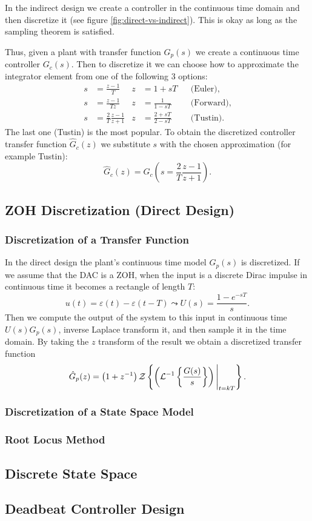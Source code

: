 In the indirect design we create a controller in the continuous time domain and then discretize it (see figure \ref{fig:direct-vs-indirect}). This is okay as long as the sampling theorem is satisfied.

Thus, given a plant with transfer function \(G_p(s)\) we create a continuous time controller \(G_c(s)\). Then to discretize it we can choose how to approximate the integrator element from one of the following 3 options:
\begin{align*}
	s & = \frac{z - 1}{T}                & z & = 1 + sT                && \text{(Euler)},   \\
	s & = \frac{z - 1}{Tz}               & z & = \frac{1}{1 - sT}      && \text{(Forward)}, \\
	s & = \frac{2}{T}\frac{z - 1}{z + 1} & z & = \frac{2 + sT}{2 - sT} && \text{(Tustin)}.
\end{align*}
The last one (Tustin) is the most popular. To obtain the discretized controller transfer function \(\hat{G}_c(z)\) we substitute \(s\) with the chosen approximation (for example Tustin):
\[
	\hat{G}_c(z) = G_c \left(s = \frac{2}{T} \frac{z - 1}{z + 1}\right).
\]

\subsection{ZOH Discretization (Direct Design)}

\subsubsection{Discretization of a Transfer Function}

In the direct design the plant's continuous time model \(G_p(s)\) is discretized. If we assume that the DAC is a ZOH, when the input is a discrete Dirac impulse in continuous time it becomes a rectangle of length \(T\):
\[
	u(t) = \varepsilon(t) - \varepsilon(t - T)
	\leadsto U(s) = \frac{1 - e^{-sT}}{s}.
\]
Then we compute the output of the system to this input in continuous time \(U(s)G_p(s)\), inverse Laplace transform it, and then sample it in the time domain. By taking the \(z\) transform of the result we obtain a discretized transfer function 
\[
	\hat{G}_p(z) = \left( 1 + z^{-1} \right) \operatorname{\mathcal{Z}} \left\{
		\left( \operatorname{\mathcal{L}}^{-1} \left\{
			\frac{G(s)}{s} \right\}
		\right) \Bigg |_{t = kT}
	\right\}.
\]

\subsubsection{Discretization of a State Space Model}


\subsubsection{Root Locus Method}


\subsection{Discrete State Space}


\subsection{Deadbeat Controller Design}

